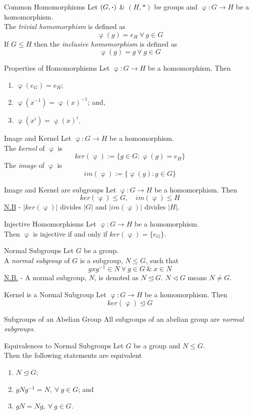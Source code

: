 \documentclass[11pt,a4paper]{article}
\begin{document}
\subtitle{Remark 15.02 - }{Common Homomorphisms}
Let $(G, \boldsymbol{\cdot})$ \& $(H, *)$ be groups and $\upvarphi : G \to H$ be a homomorphism.\\
The \textit{trivial homomorphism} is defined as
$$\upvarphi(g) = e_H\ \forall\ g \in G$$
If $G \leq H$ then the \textit{inclusive homomorphism} is defined as
$$\upvarphi(g) = g\ \forall\ g \in G$$

\subtitle{Proposition 15.03 - }{Properties of Homomorphisms}
Let $\upvarphi : G \to H$ be a homomorphism. Then
\begin{enumerate}[label=\roman*)]
  \item $\upvarphi(e_G) = e_H$;
  \item $\upvarphi(x^{-1}) = \upvarphi(x)^{-1}$; and,
  \item $\upvarphi(x^i) = \upvarphi(x)^i$.
\end{enumerate}

\subtitle{Definition 15.04 - }{Image and Kernel}
Let $\upvarphi : G \to H$ be a homomorphism.\\
The \textit{kernel} of $\upvarphi$ is
$$ker(\upvarphi) := \{g \in G : \upvarphi(g) = e_H\}$$
The \textit{image} of $\upvarphi$ is
$$im(\upvarphi) := \{\upvarphi(g) : g \in G\}$$

\subtitle{Theorem 15.05 - }{Image and Kernel are subgroups}
Let $\upvarphi : G \to H$ be a homomorphism. Then
$$ker(\upvarphi) \leq G,\quad im(\upvarphi) \leq H$$
\underline{N.B} - $|ker(\upvarphi)|$ divides $|G|$ and $|im(\upvarphi)|$ divides $|H|$.\\

\subtitle{Proposition 15.06 - }{Injective Homomorphisms}
Let $\upvarphi : G \to H$ be a homomorphism.\\
Then $\upvarphi$ is injective if and only if $ker(\upvarphi) = \{e_G\}$.\\

\subtitle{Definition 15.07 - }{Normal Subgroups}
Let $G$ be a group.\\
A \textit{normal subgroup} of $G$ is a subgroup, $N \leq G$, such that
$$gxg^{-1} \in N\ \forall\ g \in G\ \&\ x \in N$$
\underline{N.B.} - A normal subgroup, $N$, is denoted as $N \trianglelefteq G$. $N \triangleleft G$ means $N \neq G$.\\

\subtitle{Proposition 15.08 - }{Kernel is a Normal Subgroup}
Let $\upvarphi : G \to H$ be a homomorphism. Then\\
$$ker(\upvarphi) \trianglelefteq G$$

\subtitle{Theorem 15.09 - }{Subgroups of an Abelian Group}
All subgroups of an abelian group are \textit{normal subgroups}.\\

\subtitle{Proposition 15.10 - }{Equivalences to Normal Subgroups}
Let $G$ be a group and $N \leq G$.\\
Then the following statements are equivalent
\begin{enumerate}[label=\roman*)]
  \item $N \trianglelefteq G$;
  \item $gNg^{-1} = N,\ \forall\ g \in G$; and
  \item $gN = Ng,\ \forall\ g \in G$.
\end{enumerate}
\end{document}
